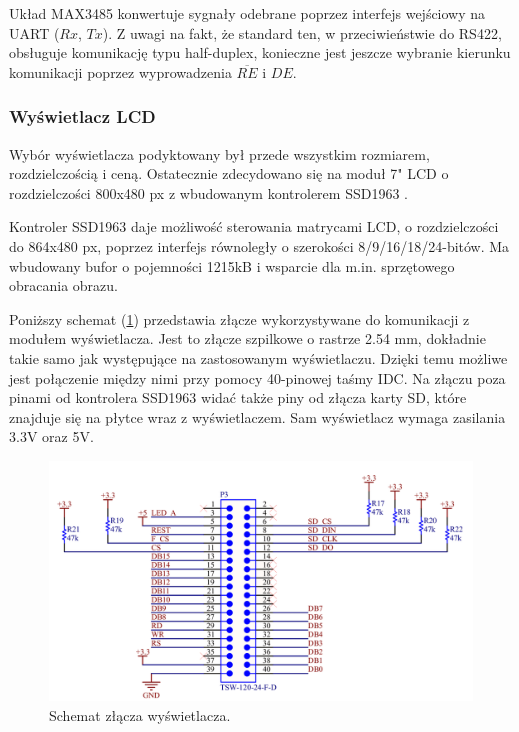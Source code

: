 Układ MAX3485 konwertuje sygnały odebrane poprzez interfejs wejściowy na UART ($Rx$, $Tx$). Z uwagi na fakt, że standard ten, w przeciwieństwie do RS422, obsługuje
komunikację typu half-duplex, konieczne jest jeszcze wybranie kierunku komunikacji poprzez wyprowadzenia $\overline{RE}$ i $DE$.




\subsubsection{Wyświetlacz LCD}

Wybór wyświetlacza podyktowany był przede wszystkim rozmiarem, rozdzielczością i ceną. Ostatecznie zdecydowano się na moduł 
7" LCD o rozdzielczości 800x480 px z wbudowanym kontrolerem SSD1963 \cite{SSD1963}. 

Kontroler SSD1963 daje możliwość sterowania matrycami LCD, o rozdzielczości do 864x480 px, poprzez interfejs równoległy o 
szerokości 8/9/16/18/24-bitów. Ma wbudowany bufor o pojemności 1215kB i wsparcie dla m.in. sprzętowego obracania obrazu.

Poniższy schemat (\ref{fig:schematWyswietlacz}) przedstawia złącze wykorzystywane do komunikacji z modułem wyświetlacza. Jest to złącze szpilkowe o rastrze 2.54 mm, dokładnie takie samo jak 
występujące na zastosowanym wyświetlaczu. Dzięki temu możliwe jest połączenie między nimi przy pomocy 40-pinowej taśmy IDC.
Na złączu poza pinami od kontrolera SSD1963 widać także piny od złącza karty SD, które znajduje się na płytce wraz z wyświetlaczem. 
Sam wyświetlacz wymaga zasilania 3.3V oraz 5V.

\begin{figure}[h!]
    \begin{center}
        \includegraphics[width = 17cm]{images/schematwyswietlacz_2.png}
        \caption{Schemat złącza wyświetlacza.}
        \label{fig:schematWyswietlacz}
    \end{center}
\end{figure}

